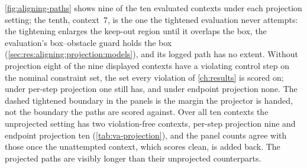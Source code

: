 \autoref{fig:aligning-paths} shows nine of the ten evaluated contexts under each projection setting;
the tenth, context~7, is the one the tightened evaluation never attempts: the tightening enlarges the
keep-out region until it overlaps the box, the evaluation's box--obstacle guard holds the box
(\autoref{sec:res:aligning:projection:models}), and its logged path has no extent. Without projection
eight of the nine displayed contexts have a violating control step on the nominal constraint set, the
set every violation of \autoref{ch:results} is scored on; under per-step projection one still has, and
under endpoint projection none. The dashed tightened boundary in the panels is the margin the projector
is handed, not the boundary the paths are scored against. Over all ten contexts the unprojected setting
has two violation-free contexts, per-step projection nine and endpoint projection ten
(\autoref{tab:va-projection}), and the panel counts agree with those once the unattempted context,
which scores clean, is added back. The projected paths are visibly longer than their unprojected
counterparts.


